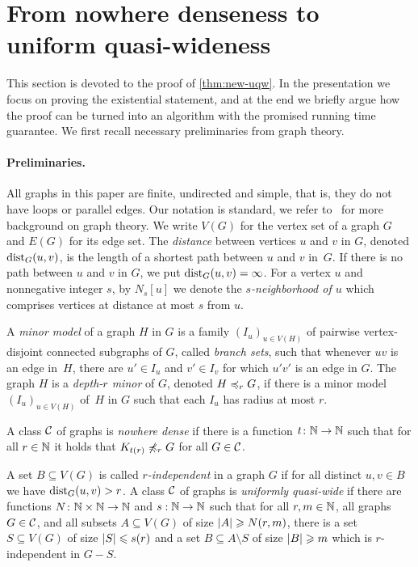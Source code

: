 \section{From nowhere denseness to uniform quasi-wideness}\label{sec:uqw}

This section is devoted to the proof of \cref{thm:new-uqw}. 
In the presentation we focus on proving the existential statement, and at the end we briefly argue how the proof can be turned into an algorithm with the promised running time guarantee.
We first recall necessary preliminaries from graph theory. 

\paragraph*{Preliminaries.}
All graphs in this paper are finite, undirected and simple, that is, 
they do not have loops or parallel edges. Our notation is standard,
we refer to~\cite{diestel2012graph} for more background on 
graph theory. 
We write $V(G)$ for the vertex set of a graph $G$ and
$E(G)$ for its edge set. 
The {\em{distance}} between vertices $u$ and $v$ in $G$, denoted $\mathrm{dist}_G(u,v)$, is the length of a shortest path between $u$ and $v$ in~$G$.
If there is no path between $u$ and $v$ in $G$, we put $\mathrm{dist}_G(u,v)=\infty$.
For a vertex $u$ and nonnegative integer $s$, by $N_s[u]$ we denote the {\em{$s$-neighborhood of $u$}} which comprises vertices at distance at most $s$ from $u$.

A {\em{minor model}} of a graph $H$ in $G$ is a family $(I_u)_{u\in V(H)}$ of pairwise vertex-disjoint connected subgraphs of $G$, called {\em{branch sets}},
such that whenever $uv$ is an edge in~$H$, there are $u'\in I_u$ and $v'\in I_v$ for which $u'v'$ 
is an edge in $G$.
The graph $H$ is a {\em{depth-$r$ minor}} of $G$, denoted $H\preccurlyeq_rG$, if there is a minor model
$(I_u)_{u\in V(H)}$ of~$H$ in $G$ such that each $I_u$ has radius at most $r$.

A class $\mathcal{C}$ of graphs is \emph{nowhere dense} if there is a function 
$t\colon \mathbb{N}\rightarrow \mathbb{N}$ such that for all $r\in \mathbb{N}$ it holds that $K_{t(r)}\not\preccurlyeq_r G$
for all $G\in \mathcal{C}$. 

A set $B\subseteq V(G)$ is called {\em{$r$-independent}} in a graph $G$ if for all
distinct $u,v\in B$ we have $\mathrm{dist}_G(u,v)>r$.
A class $\mathcal{C}$ of graphs is \emph{uniformly quasi-wide} if there are
functions $N\colon \mathbb{N}\times\mathbb{N}\rightarrow \mathbb{N}$ and $s:\mathbb{N}\rightarrow \mathbb{N}$ such
that for all $r,m\in \mathbb{N}$, all graphs $G\in \mathcal{C}$, and all subsets $A\subseteq V(G)$ of size $\left\lvert A\right\rvert\geqslant N(r,m)$, there is a set
$S\subseteq V(G)$ of size $\left\lvert S\right\rvert\leqslant s(r)$ and a set
$B\subseteq A\setminus S$ of size $\left\lvert B\right\rvert\geqslant m$ which is $r$-independent in
$G-S$. 


